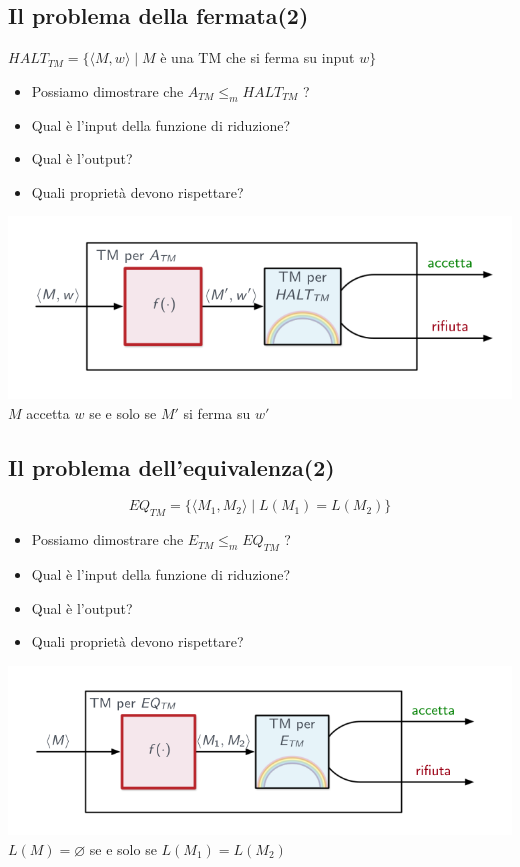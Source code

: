 \subsection{Il problema della fermata(2)}
$HALT_{TM}=\{\langle M,w\rangle\mid M$ è una TM che si ferma su input $w\}$ 
\begin{itemize}
	\item Possiamo dimostrare che $A_{TM}\leq_m HALT_{TM}$ ? 
	\item Qual è l'input della funzione di riduzione? 
	\item Qual è l'output? 
	\item Quali proprietà devono rispettare? 
\end{itemize}
\includegraphics[scale=0.5]{img/schema_halt.png}\\
$M$ accetta $w$ se e solo se $M'$ si ferma su $w'$ 
\subsection{Il problema dell'equivalenza(2)}
$$EQ_{TM}=\{\langle M_1, M_2\rangle\mid L(M_1)=L(M_2)\}$$
\begin{itemize}
	\item Possiamo dimostrare che $E_{TM}\leq_m EQ_{TM}$ ?
	\item Qual è l'input della funzione di riduzione? 
	\item Qual è l'output? 
	\item Quali proprietà devono rispettare? 
\end{itemize}
\includegraphics[scale=0.5]{img/schema_eq_tm.png}
$L(M)=\varnothing$ se e solo se $L(M_1)=L(M_2)$ 

